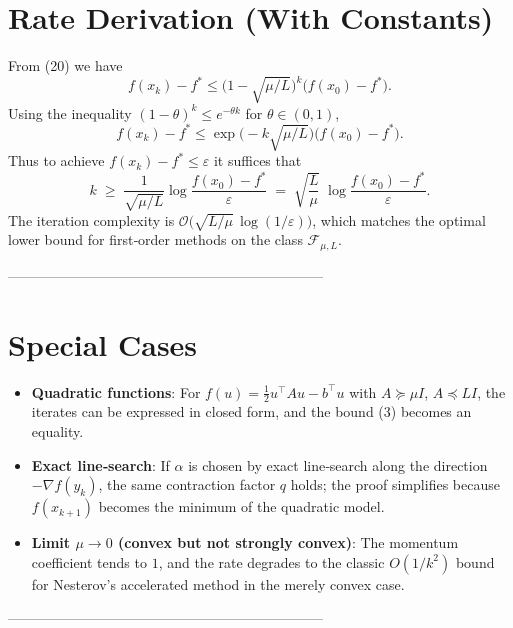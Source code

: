 \documentclass{article}
\begin{document}
\section*{Rate Derivation (With Constants)}
From (20) we have
\[
f(x_k)-f^{\ast}\le \bigl(1-\sqrt{\mu/L}\bigr)^{k}\bigl(f(x_0)-f^{\ast}\bigr).
\]
Using the inequality $(1-\theta)^{k}\le e^{-\theta k}$ for $\theta\in(0,1)$,
\[
f(x_k)-f^{\ast}\le \exp\!\bigl(-k\sqrt{\mu/L}\bigr)\bigl(f(x_0)-f^{\ast}\bigr).
\]
Thus to achieve $f(x_k)-f^{\ast}\le\varepsilon$ it suffices that
\[
k\;\ge\;\frac{1}{\sqrt{\mu/L}}\log\!\frac{f(x_0)-f^{\ast}}{\varepsilon}
\;=\; \sqrt{\frac{L}{\mu}}\;\log\!\frac{f(x_0)-f^{\ast}}{\varepsilon}.
\]
The iteration complexity is $\mathcal{O}\!\bigl(\sqrt{L/\mu}\,\log(1/\varepsilon)\bigr)$, which matches the optimal lower bound for first‑order methods on the class $\mathcal{F}_{\mu,L}$.

--------------------------------------------------------------------
\section*{Special Cases}
\begin{itemize}
\item \textbf{Quadratic functions}: For $f(u)=\frac{1}{2}u^{\top}Au-b^{\top}u$ with $A\succeq\mu I$, $A\preceq L I$, the iterates can be expressed in closed form, and the bound (3) becomes an equality.
\item \textbf{Exact line‑search}: If $\alpha$ is chosen by exact line‑search along the direction $-\nabla f(y_k)$, the same contraction factor $q$ holds; the proof simplifies because $f(x_{k+1})$ becomes the minimum of the quadratic model.
\item \textbf{Limit $\mu\to0$ (convex but not strongly convex)}: The momentum coefficient tends to $1$, and the rate degrades to the classic $O(1/k^{2})$ bound for Nesterov’s accelerated method in the merely convex case.
\end{itemize}

--------------------------------------------------------------------
\end{document}
